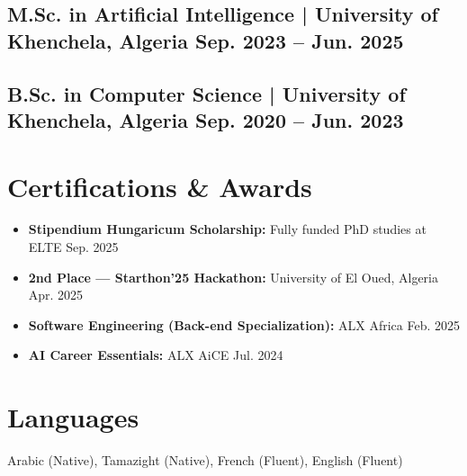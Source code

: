 \documentclass[10pt]{article}
\begin{document}
\subsection{M.Sc. in Artificial Intelligence | \mdseries University of Khenchela, Algeria \hfill \bfseries Sep. 2023 -- Jun. 2025}

\subsection{B.Sc. in Computer Science | \mdseries University of Khenchela, Algeria \hfill \bfseries Sep. 2020 -- Jun. 2023}

\vspace{2pt}
\section{Certifications \& Awards}
\begin{itemize}
    \item \textbf{Stipendium Hungaricum Scholarship:} Fully funded PhD studies at ELTE \hfill Sep. 2025
    \item \textbf{2nd Place --- Starthon'25 Hackathon:} University of El Oued, Algeria \hfill Apr. 2025
    \item \textbf{Software Engineering (Back-end Specialization):} ALX Africa \href{https://savanna.alxafrica.com/certificates/yNTLX6BYHR}{\faCertificate} \hfill Feb. 2025
    \item \textbf{AI Career Essentials:} ALX AiCE \href{https://savanna.alxafrica.com/certificates/YEM9LC5BNm}{\faCertificate} \hfill Jul. 2024
\end{itemize}

\section{Languages}
\noindent Arabic (Native), Tamazight (Native), French (Fluent), English (Fluent)
\end{document}
